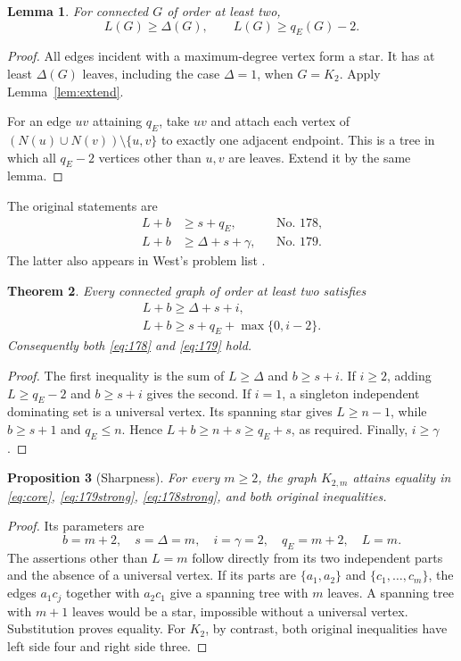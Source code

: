 \documentclass[11pt,a4paper]{article}
\newtheorem{theorem}{Theorem}[section]
\newtheorem{lemma}[theorem]{Lemma}
\newtheorem{proposition}[theorem]{Proposition}
\theoremstyle{remark}
\begin{document}
\begin{lemma}\label{lem:leafbounds}
For connected $G$ of order at least two,
\begin{equation}\label{eq:leafbounds}
L(G)\ge\Delta(G),\qquad L(G)\ge q_E(G)-2.
\end{equation}
\end{lemma}
\begin{proof}
All edges incident with a maximum-degree vertex form a star. It has at
least $\Delta(G)$ leaves, including the case $\Delta=1$, when $G=K_2$.
Apply Lemma~\ref{lem:extend}.

For an edge $uv$ attaining $q_E$, take $uv$ and attach each vertex of
$(N(u)\cup N(v))\setminus\{u,v\}$ to exactly one adjacent endpoint.
This is a tree in which all $q_E-2$ vertices other than $u,v$ are leaves.
Extend it by the same lemma.
\end{proof}

The original statements are
\begin{align}
L+b&\ge s+q_E,&&\text{No. 178},\label{eq:178}\\
L+b&\ge\Delta+s+\gamma,&&\text{No. 179}.\label{eq:179}
\end{align}
The latter also appears in West's problem list \cite{West}.

\begin{theorem}\label{thm:178179}
Every connected graph of order at least two satisfies
\begin{align}
\boxed{L+b\ge\Delta+s+i,}\label{eq:179strong}\\
\boxed{L+b\ge s+q_E+\max\{0,i-2\}.}\label{eq:178strong}
\end{align}
Consequently both \eqref{eq:178} and \eqref{eq:179} hold.
\end{theorem}
\begin{proof}
The first inequality is the sum of $L\ge\Delta$ and $b\ge s+i$.
If $i\ge2$, adding $L\ge q_E-2$ and $b\ge s+i$ gives the second.
If $i=1$, a singleton independent dominating set is a universal vertex.
Its spanning star gives $L\ge n-1$, while $b\ge s+1$ and $q_E\le n$.
Hence $L+b\ge n+s\ge q_E+s$, as required. Finally, $i\ge\gamma$.
\end{proof}

\begin{proposition}[Sharpness]\label{prop:k2m}
For every $m\ge2$, the graph $K_{2,m}$ attains equality in \eqref{eq:core},
\eqref{eq:179strong}, \eqref{eq:178strong}, and both original inequalities.
\end{proposition}
\begin{proof}
Its parameters are
\[
b=m+2,\quad s=\Delta=m,\quad i=\gamma=2,\quad q_E=m+2,\quad L=m.
\]
The assertions other than $L=m$ follow directly from its two independent
parts and the absence of a universal vertex. If its parts are
$\{a_1,a_2\}$ and $\{c_1,\ldots,c_m\}$, the edges $a_1c_j$ together
with $a_2c_1$ give a spanning tree with $m$ leaves. A spanning tree with
$m+1$ leaves would be a star, impossible without a universal vertex.
Substitution proves equality. For $K_2$, by contrast, both original
inequalities have left side four and right side three.
\end{proof}
\end{document}
